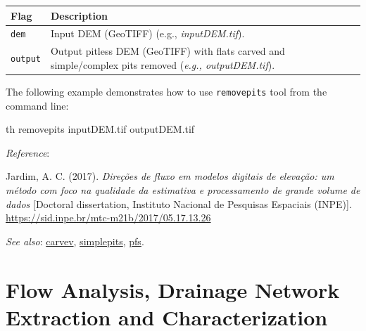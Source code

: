 \documentclass[
]{book}
\newenvironment{Shaded}{\begin{snugshade}}{\end{snugshade}}
\newcommand{\ExtensionTok}[1]{#1}
\newcommand{\NormalTok}[1]{#1}
\begin{document}
\begin{longtable}[]{@{}
  >{\raggedright\arraybackslash}p{}
  >{\raggedright\arraybackslash}p{}@{}}
\toprule\noalign{}
\begin{minipage}[b]{\linewidth}\raggedright
Flag
\end{minipage} & \begin{minipage}[b]{\linewidth}\raggedright
Description
\end{minipage} \\
\midrule\noalign{}
\endhead
\bottomrule\noalign{}
\endlastfoot
\texttt{dem} & Input DEM (GeoTIFF) (e.g., \emph{inputDEM.tif}). \\
\texttt{output} & Output pitless DEM (GeoTIFF) with flats carved and simple/complex pits removed (\emph{e.g., outputDEM.tif}). \\
\end{longtable}

The following example demonstrates how to use \texttt{removepits} tool from the command line:

\begin{Shaded}
\begin{Highlighting}[]
\ExtensionTok{th}\NormalTok{ removepits inputDEM.tif outputDEM.tif}
\end{Highlighting}
\end{Shaded}

\emph{Reference}:

Jardim, A. C. (2017). \emph{Direções de fluxo em modelos digitais de elevação: um método com foco na qualidade da estimativa e processamento de grande volume de dados} {[}Doctoral dissertation, Instituto Nacional de Pesquisas Espaciais (INPE){]}. \href{http://mtc-m21b.sid.inpe.br/col/sid.inpe.br/mtc-m21b/2017/05.17.13.26/doc/publicacao.pdf?metadatarepository=sid.inpe.br/mtc-m21b/2017/05.17.13.26.57&mirror=sid.inpe.br/mtc-m21b/2013/09.26.14.25.22&languagebutton=en}{https://sid.inpe.br/mtc-m21b/2017/05.17.13.26}

\emph{See also}: \hyperref[carvev]{carvev}, \hyperref[simplepits]{simplepits}, \hyperref[pfs]{pfs}.

\section{Flow Analysis, Drainage Network Extraction and Characterization}\label{Flow-Analysis-Drainage-Network-Extraction-and-Characterization}
\end{document}
